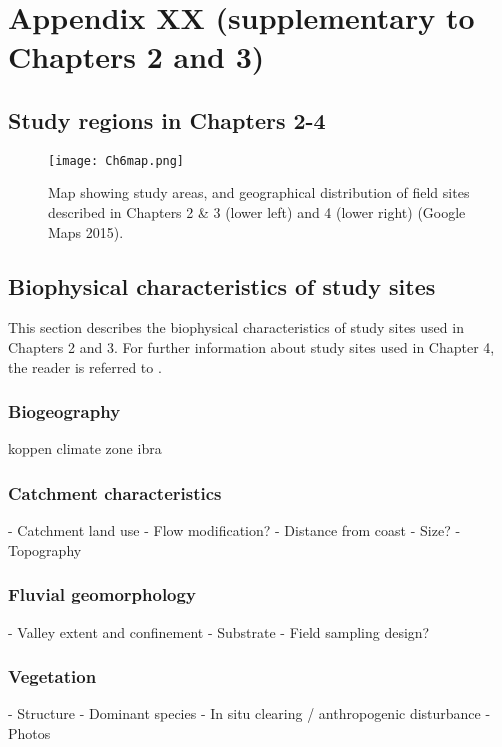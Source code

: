 \chapter[Appendix XX]{Appendix XX (supplementary to Chapters 2 and 3)}

\section{Study regions in Chapters 2-4}

\begin{figure}[ht]
\begin{center}
\texttt{[image: Ch6map.png]} %
\caption[Map of study areas described in Chapters 2-4.]{\small{Map showing study areas, and geographical distribution of field sites described in Chapters 2 \& 3 (lower left) and 4 (lower right) (Google Maps 2015).}\label{fig:Ch6_F1}}
\end{center}
\end{figure}   
\clearpage

\section{Biophysical characteristics of study sites}

This section describes the biophysical characteristics of study sites used in Chapters 2 and 3. For further information about study sites used in Chapter 4, the reader is referred to \citep{Arthington2012}.

\subsection{Biogeography}
koppen climate zone
ibra


\subsection{Catchment characteristics}

-	Catchment land use
-	Flow modification?
-	Distance from coast
-	Size?
-	Topography

\subsection{Fluvial geomorphology}

-	Valley extent and confinement
-	Substrate
-	Field sampling design?


\subsection{Vegetation}

-	Structure
-	Dominant species
-	In situ clearing / anthropogenic disturbance
-	Photos



